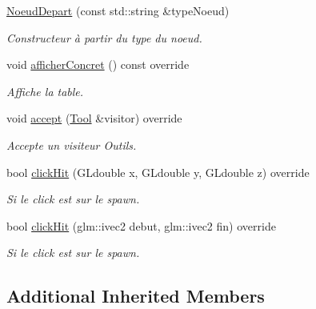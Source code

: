 \begin{DoxyCompactItemize}
\item 
\hyperlink{class_noeud_depart_a003d2fbed3f4e142a9187a8152a4663d}{Noeud\+Depart} (const std\+::string \&type\+Noeud)
\begin{DoxyCompactList}\small\item\em Constructeur à partir du type du noeud. \end{DoxyCompactList}\item 
void \hyperlink{class_noeud_depart_a1335eaf607cc753bf818aded966144fe}{afficher\+Concret} () const  override
\begin{DoxyCompactList}\small\item\em Affiche la table. \end{DoxyCompactList}\item 
\hypertarget{class_noeud_depart_a5c105e25f600256c8933f70e07608413}{}void \hyperlink{class_noeud_depart_a5c105e25f600256c8933f70e07608413}{accept} (\hyperlink{class_tool}{Tool} \&visitor) override\label{class_noeud_depart_a5c105e25f600256c8933f70e07608413}

\begin{DoxyCompactList}\small\item\em Accepte un visiteur Outils. \end{DoxyCompactList}\item 
\hypertarget{class_noeud_depart_a0ad821bd85fa11787016020daa3947fe}{}bool \hyperlink{class_noeud_depart_a0ad821bd85fa11787016020daa3947fe}{click\+Hit} (G\+Ldouble x, G\+Ldouble y, G\+Ldouble z) override\label{class_noeud_depart_a0ad821bd85fa11787016020daa3947fe}

\begin{DoxyCompactList}\small\item\em Si le click est sur le spawn. \end{DoxyCompactList}\item 
\hypertarget{class_noeud_depart_a2dfe8b7300b4f1933993d44754e8f53f}{}bool \hyperlink{class_noeud_depart_a2dfe8b7300b4f1933993d44754e8f53f}{click\+Hit} (glm\+::ivec2 debut, glm\+::ivec2 fin) override\label{class_noeud_depart_a2dfe8b7300b4f1933993d44754e8f53f}

\begin{DoxyCompactList}\small\item\em Si le click est sur le spawn. \end{DoxyCompactList}\end{DoxyCompactItemize}

\subsection*{Additional Inherited Members}


